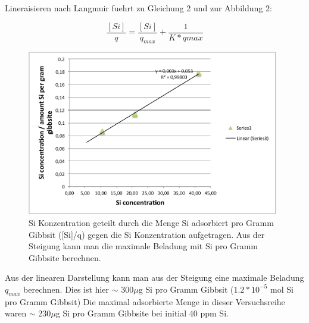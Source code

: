 \documentclass[12pt]{amsart}
\begin{document}
Lineraisieren nach Langmuir fuehrt zu Gleichung 2 und zur Abbildung 2:

\begin{equation}
\frac{[Si]}{q}=\frac{[Si]}{q_{max}}+\frac{1}{K*q{max}}
\end{equation}

\begin{figure}[htbp]
\begin{center}
\includegraphics[width=11cm]{figures/langmuir_fig_lin.pdf}
\caption{Si Konzentration geteilt durch die Menge Si adsorbiert pro Gramm Gibbsit ([Si]/q) gegen die Si Konzentration aufgetragen. Aus der Steigung kann man die maximale Beladung mit Si pro Gramm Gibbsite berechnen. }
\label{default}
\end{center}
\end{figure}

Aus der linearen Darstellung kann man aus der Steigung  eine maximale Beladung $q_{max}$ berechnen.
Dies ist hier $\sim$ 300$\mu$g Si pro Gramm Gibbsit ($1.2*10^{-5}$ mol Si pro Gramm Gibbsit)
Die maximal adsorbierte Menge in dieser Versuchsreihe waren  $\sim$ 230$\mu$g Si pro Gramm Gibbsite bei initial 40 ppm Si.
\end{document}
